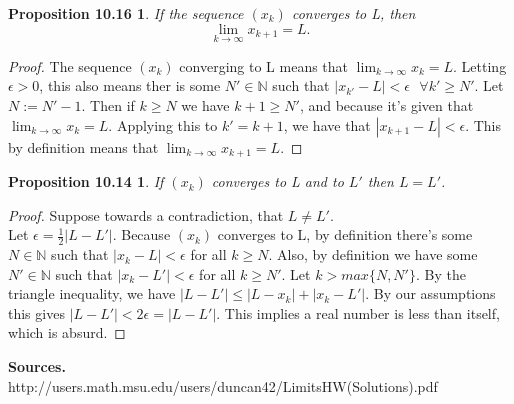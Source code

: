 \documentclass[12pt]{amsart}
\newcommand{\N}{\mathbb{N}}
\begin{document}
\newtheorem*{prop10.16}{Proposition 10.16}
\begin{prop10.16}
	If the sequence $(x_k)$ converges to L, then $$\lim_{k \to \infty} x_{k+1} = L.$$
\end{prop10.16}

\begin{proof}
	The sequence $(x_k)$ converging to L means that $\displaystyle{\lim_{k \to \infty}} x_{k} = L.$ Letting $\epsilon > 0$, this also means ther is some $N' \in \N$ such that $|x_{k'} - L| < \epsilon \textrm{   }\forall k' \geq N'$. Let $N := N' - 1$. Then if $k \geq N$ we have $k + 1 \geq N'$, and because it's given that $\displaystyle{\lim_{k \to \infty}} x_{k} = L.$ Applying this to $k' = k + 1$, we have that $|x_{k+1} - L| < \epsilon$. This by definition means that $\displaystyle{\lim_{k \to \infty}} x_{k+1} = L.$
\end{proof}

\newtheorem*{prop10.14}{Proposition 10.14}
\begin{prop10.14}
	If $(x_k)$ converges to L and to $L'$ then $L = L'$.
\end{prop10.14}

\begin{proof}
	Suppose towards a contradiction, that $L \neq L'$.
	\\ Let $\epsilon = \frac{1}{2}|L - L'|$. Because $(x_k)$ converges to L, by definition there's some $N \in \N$ such that $|x_k - L| < \epsilon$ for all $k \geq N$. Also, by definition we have some $N' \in \N$ such that $|x_k - L'| < \epsilon$ for all $k \geq N'$. Let $k > max\{N,N'\}$. By the triangle inequality, we have $|L - L'| \leq |L - x_k| + |x_k - L'|.$ By our assumptions this gives $|L - L'| < 2\epsilon = |L - L'|$. This implies a real number is less than itself, which is absurd.
\end{proof}

\noindent\textbf{Sources.}
\\http://users.math.msu.edu/users/duncan42/LimitsHW(Solutions).pdf
\end{document}
